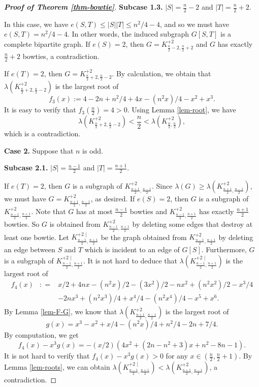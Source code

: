 \documentclass[11pt]{article}
\begin{document}
\begin{proof}[{\bf Proof of Theorem \ref{thm-bowtie}}]
{\bf Subcase 1.3.}  $|S|= \frac{n}{2} -2$ and $|T|=\frac{n}{2} +2$. 


In this case, we have $e(S,T)\le |S| |T| \le 
 n^2/4  -4$, and so we must have 
$e(S,T) = n^2/4  -4$. In other words, 
the induced subgraph $G[S,T]$ is a complete bipartite graph. 
 If $e(S)=2$, then $G=K_{\frac{n}{2} -2, \frac{n}{2} +2}^{+2}$ 
 and $G$ has exactly $\frac{n}{2} +2$ bowties, 
a contradiction.  

If $e(T)=2$, then  $G= K_{\frac{n}{2} +2, \frac{n}{2} -2}^{+2}$. 
By calculation, we obtain that $\lambda (K_{\frac{n}{2} +2, \frac{n}{2} -2}^{+2}) $ is the largest root of 
\[   f_3(x) := 4 - 2 n + n^2/4 + 4 x - (n^2 x)/4 - x^2 + x^3.   \]
It is easy to verify that $f_3(\frac{n}{2}) = 4 >0$. 
Using Lemma \ref{lem-root}, 
 we have 
 \[ \lambda (K_{\frac{n}{2} +2, \frac{n}{2} -2}^{+2}) < \frac{n}{2} <
 \lambda (K_{\frac{n}{2},\frac{n}{2}}^{+2}), \]  
 which is a contradiction. 
 
 


\medskip 
{\bf Case 2.} Suppose that $n$ is odd. 

{\bf Subcase 2.1.}  $|S|= \frac{n-1}{2} $ and $|T|=\frac{n+1}{2}$. 


If $e(T)=2$, then $G$ is a subgraph of $K_{\frac{n+1}{2} , \frac{n-1}{2} }^{+2}$. 
Since $\lambda (G) \ge \lambda (K_{\frac{n+1}{2} , \frac{n-1}{2} }^{+2})$, we must have $G=K_{\frac{n+1}{2} , \frac{n-1}{2} }^{+2}$, as desired.   
If $e(S)=2$, then $G$ is a subgraph of $K_{\frac{n-1}{2} , \frac{n+1}{2} }^{+2}$. 
Note that $G$ has at most $\frac{n-1}{2}$ bowties and 
$K_{\frac{n-1}{2} , \frac{n+1}{2} }^{+2}$ has exactly 
$\frac{n+1}{2}$ bowties. 
So $G$ is obtained from $K_{\frac{n-1}{2} , \frac{n+1}{2} }^{+2}$ by deleting some edges 
that destroy at least one bowtie. 
Let $K_{\frac{n-1}{2} , \frac{n+1}{2} }^{+2\,\, |}$ be
the graph obtained 
from $K_{\frac{n-1}{2} , \frac{n+1}{2} }^{+2}$ by deleting 
an edge between $S$ and $T$ which is incident to an edge 
of $G[S]$. 
Furthermore, $G$ is a subgraph of 
$K_{\frac{n-1}{2} , \frac{n+1}{2} }^{+2\,\, |}$. 
It is not hard to deduce that 
$\lambda (K_{\frac{n-1}{2} , \frac{n+1}{2} }^{+2\,\, |})$ 
is the largest root of 
\begin{eqnarray*}
  f_4(x) &: =& x/2 + 4 n x - (n^2 x)/2 - (3 x^2)/2 - n x^2 + (n^2 x^2)/2 - x^3/4 \\ 
  & & -  2 n x^3 + (n^2 x^3)/4 + x^4/4 - (n^2 x^4)/4 - x^5 + x^6.  
 \end{eqnarray*}
By Lemma \ref{lem-F-G}, we know that $\lambda (K_{ \frac{n+1}{2}, \frac{n-1}{2}}^{+2})$ 
 is the largest root of 
 \[  g(x)=x^3 - x^2 + x/4 - (n^2 x)/4 + n^2/4 - 2 n + 7/4. \]    
 By computation, we get 
 \[ f_4(x) - x^3g(x) = - ({x}/{2}) (4x^2 + 
 (2n-n^2+3)x  + n^2 -8n -1). \]   
It is not hard to verify that $f_4(x) - x^3 g(x) >0$ 
for any $x\in (\frac{n}{2}, \frac{n}{2} +1)$. 
By Lemma \ref{lem-roots}, we can obtain 
$\lambda (K_{\frac{n-1}{2} , \frac{n+1}{2} }^{+2\,\, |})< 
\lambda (K_{ \frac{n+1}{2}, \frac{n-1}{2}}^{+2})$, 
a contradiction. 



\end{proof}
\end{document}
